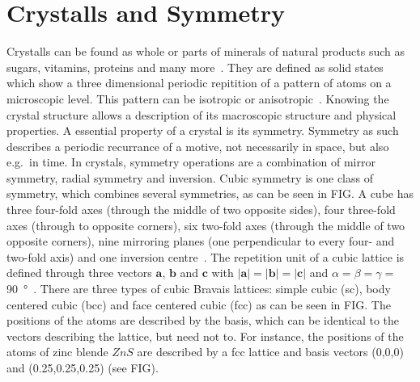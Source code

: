  
\section{Crystalls and Symmetry}\label{sec:Q4}

Crystalls can be found as whole or parts of minerals of natural products such as sugars, vitamins, proteins and many more~\cite{Bohm.2021}. They are defined as solid states which show a three dimensional periodic repitition of a pattern of atoms on a microscopic level. This pattern can be isotropic or anisotropic~\cite{Schwarzenbach.2001}. Knowing the crystal structure allows a description of its macroscopic structure and physical properties. A essential property of a crystal is its symmetry. Symmetry as such describes a periodic recurrance of a motive, not necessarily in space, but also e.g.~in time. In crystals, symmetry operations are a combination of mirror symmetry, radial symmetry and inversion. Cubic symmetry is one class of symmetry, which combines several symmetries, as can be seen in FIG. A cube has three four-fold axes (through the middle of two opposite sides), four three-fold axes (through to opposite corners), six two-fold axes (through the middle of two opposite corners), nine mirroring planes (one perpendicular to every four- and two-fold axis) and one inversion centre~\cite{Bohm.2021}. The repetition unit of a cubic lattice is defined through three vectors $\mathbf{a}$, $\mathbf{b}$ and $\mathbf{c}$ with $|\mathbf{a}|=|\mathbf{b}|=|\mathbf{c}|$ and $\alpha = \beta = \gamma =$ \SI{90}{\degree}~\cite{Schwarzenbach.2001}. There are three types of cubic Bravais lattices: simple cubic (sc), body centered cubic (bcc) and face centered cubic (fcc) as can be seen in FIG. The positions of the atoms are described by the basis, which can be identical to the vectors describing the lattice, but need not to. For instance, the positions of the atoms of zinc blende $ZnS$ are described by a fcc lattice and basis vectors (0,0,0) and (0.25,0.25,0.25) (see FIG).